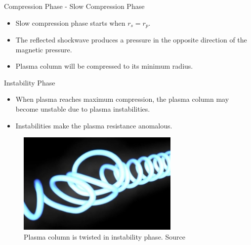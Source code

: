 \begin{frame} {Compression Phase - Slow Compression Phase}
    \begin{itemize}
        \item Slow compression phase starts when $r_s=r_p$.
        \item The reflected shockwave produces a pressure in the opposite direction of the magnetic pressure.
        \item Plasma column will be compressed to its minimum radius.
    \end{itemize}
\end{frame}

\begin{frame} {Instability Phase}
    \begin{itemize}
        \item When plasma reaches maximum compression, the plasma column may become unstable due to plasma instabilities.
        \item Instabilities make the plasma resistance anomalous.
    \end{itemize}
    \begin{figure}
        \centering
        \includegraphics[width=0.7\textwidth]{figures/instability-phase.png}
        \caption{Plasma column is twisted in instability phase. Source \cite{lppfusion_device_fusion}}
        \label{fig:instability-phase}
    \end{figure}
\end{frame}